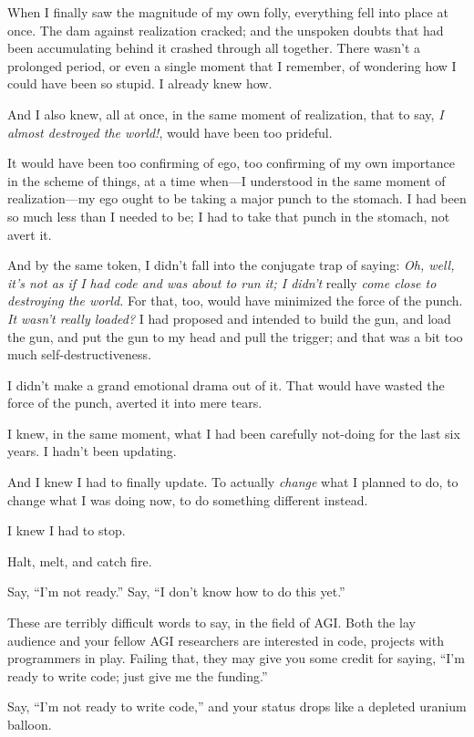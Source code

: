{
 When I finally saw the magnitude of my own folly, everything fell
into place at once. The dam against realization cracked; and the
unspoken doubts that had been accumulating behind it crashed through
all together. There wasn't a prolonged period, or even
a single moment that I remember, of wondering how I could have been so
stupid. I already knew how.}

{
 And I also knew, all at once, in the same moment of realization,
that to say, \textit{I almost destroyed the world!}, would have been
too prideful.}

{
 It would have been too confirming of ego, too confirming of my own
importance in the scheme of things, at a time when---I understood in
the same moment of realization---my ego ought to be taking a major
punch to the stomach. I had been so much less than I needed to be; I
had to take that punch in the stomach, not avert it.}

{
 And by the same token, I didn't fall into the
conjugate trap of saying: \textit{Oh, well, it's not as
if I had code and was about to run it; I didn't} really
\textit{come close to destroying the world.} For that, too, would have
minimized the force of the punch. \textit{It wasn't
really loaded?} I had proposed and intended to build the gun, and load
the gun, and put the gun to my head and pull the trigger; and that was
a bit too much self-destructiveness.}

{
 I didn't make a grand emotional drama out of it.
That would have wasted the force of the punch, averted it into mere
tears.}

{
 I knew, in the same moment, what I had been carefully not-doing
for the last six years. I hadn't been updating.}

{
 And I knew I had to finally update. To actually \textit{change}
what I planned to do, to change what I was doing now, to do something
different instead.}

{
 I knew I had to stop.}

{
 Halt, melt, and catch fire.}

{
 Say, ``I'm not
ready.'' Say, ``I
don't know how to do this yet.''}

{
 These are terribly difficult words to say, in the field of AGI.
Both the lay audience and your fellow AGI researchers are interested in
code, projects with programmers in play. Failing that, they may give
you some credit for saying, ``I'm
ready to write code; just give me the funding.''}

{
 Say, ``I'm not ready to write
code,'' and your status drops like a depleted uranium
balloon.}

